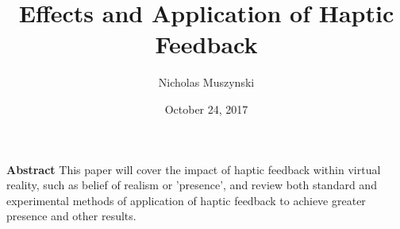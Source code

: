 \documentclass{article}
\begin{document}
\title{Effects and Application of Haptic Feedback}
\author{Nicholas Muszynski}
\date{October 24, 2017}

\maketitle

\textbf{Abstract}
\newline
This paper will cover the impact of haptic feedback within virtual reality, such as belief of realism or 'presence', and review both standard and experimental methods of application of haptic feedback to achieve greater presence and other results.
\end{document}
